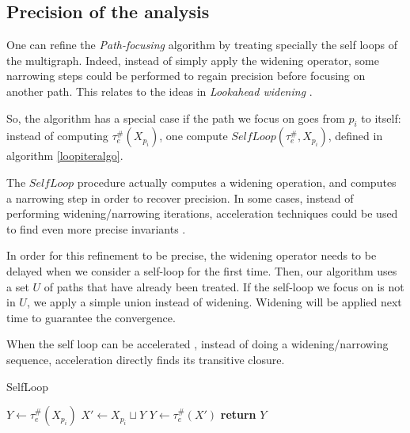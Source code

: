 \documentclass[a4paper,english,titlepage,11pt]{report}
\begin{document}
	\subsection {Precision of the analysis}

	One can refine the \emph{Path-focusing} algorithm by treating specially the
	self loops of the multigraph. Indeed, instead of simply apply the widening
	operator,  some narrowing steps could be performed to regain precision
	before focusing on another path. This relates to the ideas in
        \emph{Lookahead widening} \cite{GopanR06}.

	So, the algorithm has a special case if the path we focus on goes from $p_i$
	to itself: instead of computing $\tau_e^\#(X_{p_i})$, one compute
	$SelfLoop(\tau_e^\#,X_{p_i})$, defined in algorithm \ref{loopiteralgo}.

	The $SelfLoop$ procedure actually computes a widening operation, and
	computes a narrowing step in order to recover precision. In some cases,
	instead of performing widening/narrowing iterations, 
	acceleration techniques could be used 
	to find even more precise invariants \cite{GH06}.

	In order for this refinement to be precise, the widening
	operator needs to be delayed
	when we consider a self-loop for the first time. Then, our
	algorithm uses a set $U$ of paths that have already been treated. If the
	self-loop we focus on is not in $U$, we apply a simple union instead of
	widening. Widening will be applied next time to guarantee the convergence.

	When the self loop can be accelerated \cite{Gon07}, instead of doing a
	widening/narrowing sequence,  acceleration directly finds
	its transitive closure.

\begin{algorithm}
\caption{SelfLoop}
\label{loopiteralgo}
\begin{algorithmic}[1] 
	\State $Y \gets \tau_e^\#(X_{p_i})$
	\State $X' \gets X_{p_i} \sqcup Y$
	\State $Y \gets \tau_e^\#(X')$
	\State \textbf{return} $Y$
\EndProcedure
\end{algorithmic}
\end{algorithm}
\end{document}
